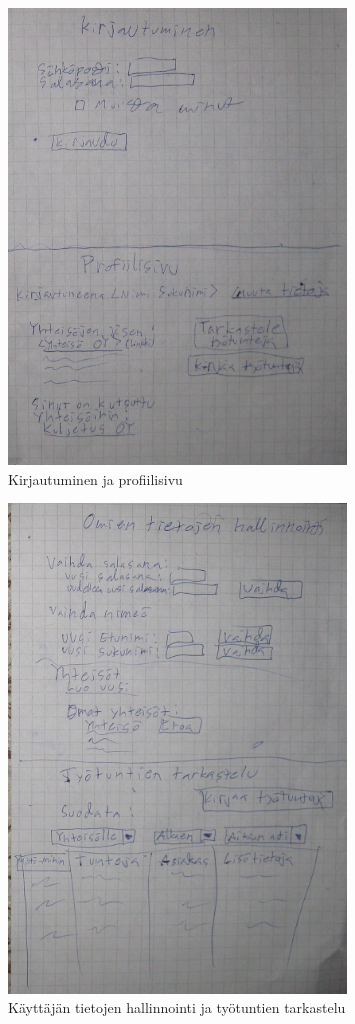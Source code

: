 \documentclass[a4paper, 12pt finnish]{article}
\begin{document}
\begin{figure}[h]
    \centering
    \includegraphics[width=0.8\textwidth]{kirjautuminen.png}
    \caption{\small Kirjautuminen ja profiilisivu}
\end{figure}
\begin{figure}[h]
    \centering
    \includegraphics[width=0.8\textwidth]{omattiedot.png}
    \caption{\small Käyttäjän tietojen hallinnointi ja työtuntien
    tarkastelu}
\end{figure}
\end{document}
